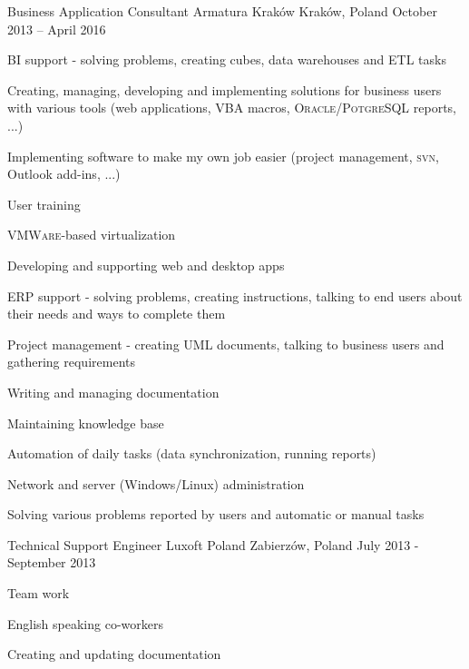\begin{cventries}
  \cventry
    {Business Application Consultant} %
    {Armatura Kraków} %
    {Kraków, Poland} %
    {October 2013 -- April 2016} %
    {
      \begin{cvitems} %
        \item {BI support - solving problems, creating cubes, data warehouses and \textsc{ETL} tasks}
        \item {Creating, managing, developing and implementing solutions for business users with various tools (web applications, \textsc{VBA} macros, \textsc{Oracle}/\textsc{PotgreSQL} reports, ...)}
        \item {Implementing software to make my own job easier (project management, \textsc{svn}, Outlook add-ins, ...)}
        \item {User training}
        \item {\textsc{VMWare}-based virtualization}
   		\item {Developing and supporting web and desktop apps}
        \item {ERP support - solving problems, creating instructions, talking to end users about their needs and ways to complete them}
        \item {Project management - creating \textsc{UML} documents, talking to business users and gathering requirements}
        \item {Writing and managing documentation}
        \item {Maintaining knowledge base}
        \item {Automation of daily tasks (data synchronization, running reports)}
        \item {Network and server (Windows/Linux) administration}
        \item {Solving various problems reported by users and automatic or manual tasks}
      \end{cvitems}
    }

  \cventry
    {Technical Support Engineer} %
    {Luxoft Poland} %
    {Zabierzów, Poland} %
    {July 2013 - September 2013} %
    {
      \begin{cvitems} %
       \item {Team work}
       		\item {English speaking co-workers}
       		\item {Creating and updating documentation}
      \end{cvitems} 
    }


\end{cventries}
